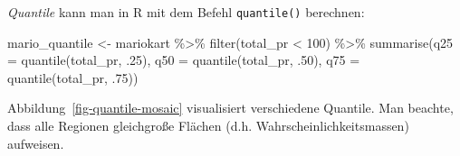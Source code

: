 \documentclass[
  letterpaper,
  oneside,
  open=any]{scrbook}
\newenvironment{Shaded}{\begin{snugshade}}{\end{snugshade}}
\newcommand{\AttributeTok}[1]{\textcolor[rgb]{0.40,0.45,0.13}{#1}}
\newcommand{\DecValTok}[1]{\textcolor[rgb]{0.68,0.00,0.00}{#1}}
\newcommand{\FunctionTok}[1]{\textcolor[rgb]{0.28,0.35,0.67}{#1}}
\newcommand{\NormalTok}[1]{\textcolor[rgb]{0.00,0.23,0.31}{#1}}
\newcommand{\OtherTok}[1]{\textcolor[rgb]{0.00,0.23,0.31}{#1}}
\newcommand{\SpecialCharTok}[1]{\textcolor[rgb]{0.37,0.37,0.37}{#1}}
\theoremstyle{definition}
\theoremstyle{definition}
\theoremstyle{definition}
\theoremstyle{remark}
\begin{document}
\emph{Quantile} kann man in R mit dem Befehl \texttt{quantile()}
berechnen:

\begin{Shaded}
\begin{Highlighting}[]
\NormalTok{mario\_quantile }\OtherTok{\textless{}{-}} 
\NormalTok{mariokart }\SpecialCharTok{\%\textgreater{}\%} 
  \FunctionTok{filter}\NormalTok{(total\_pr }\SpecialCharTok{\textless{}} \DecValTok{100}\NormalTok{) }\SpecialCharTok{\%\textgreater{}\%} 
  \FunctionTok{summarise}\NormalTok{(}\AttributeTok{q25 =} \FunctionTok{quantile}\NormalTok{(total\_pr, .}\DecValTok{25}\NormalTok{),}
            \AttributeTok{q50 =} \FunctionTok{quantile}\NormalTok{(total\_pr, .}\DecValTok{50}\NormalTok{),}
            \AttributeTok{q75 =} \FunctionTok{quantile}\NormalTok{(total\_pr, .}\DecValTok{75}\NormalTok{))}
\end{Highlighting}
\end{Shaded}

Abbildung~\ref{fig-quantile-mosaic} visualisiert verschiedene Quantile.
Man beachte, dass alle Regionen gleichgroße Flächen (d.h.
Wahrscheinlichkeitsmassen) aufweisen.
\end{document}
